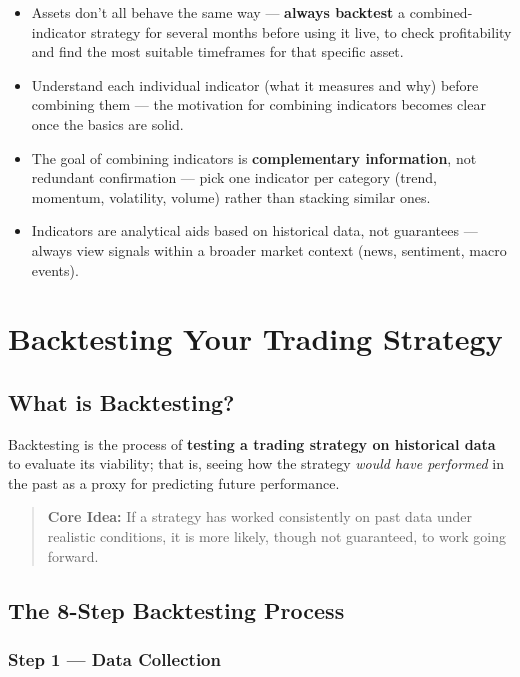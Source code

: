 \documentclass[12pt,openany]{book}
\begin{document}
\begin{itemize}[leftmargin=*]
    \item Assets don't all behave the same way --- \textbf{always backtest} a combined-indicator strategy for several months before using it live, to check profitability and find the most suitable timeframes for that specific asset.
    \item Understand each individual indicator (what it measures and why) before combining them --- the motivation for combining indicators becomes clear once the basics are solid.
    \item The goal of combining indicators is \textbf{complementary information}, not redundant confirmation --- pick one indicator per category (trend, momentum, volatility, volume) rather than stacking similar ones.
    \item Indicators are analytical aids based on historical data, not guarantees --- always view signals within a broader market context (news, sentiment, macro events).
\end{itemize}

\section{Backtesting Your Trading Strategy}

\subsection{What is Backtesting?}

Backtesting is the process of \textbf{testing a trading strategy on historical data} to evaluate its viability; that is, seeing how the strategy \emph{would have performed} in the past as a proxy for predicting future performance.

\begin{quote}
    \textbf{Core Idea:} If a strategy has worked consistently on past data under realistic conditions, it is more likely, though not guaranteed, to work going forward.
\end{quote}

\subsection{The 8-Step Backtesting Process}

\subsubsection{Step 1 --- Data Collection}
\end{document}
